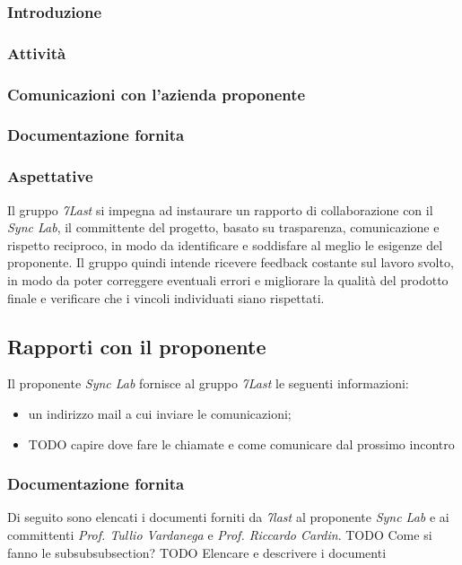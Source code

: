 \documentclass[italian,12pt]{article} %
\begin{document}
\subsubsection{Introduzione}
\subsubsection{Attività}
\subsubsection{Comunicazioni con l'azienda proponente}
\subsubsection{Documentazione fornita}

\subsubsection{Aspettative}
Il gruppo \textit{7Last} si impegna ad instaurare un rapporto di collaborazione con il \textit{Sync Lab}, il committente del progetto, basato su trasparenza, comunicazione e rispetto reciproco, in modo da identificare e soddisfare al meglio le esigenze del proponente.
Il gruppo quindi intende ricevere feedback costante sul lavoro svolto, in modo da poter correggere eventuali errori e migliorare la qualità del prodotto finale e verificare che i vincoli individuati siano rispettati.

\subsection{Rapporti con il proponente}
Il proponente \textit{Sync Lab} fornisce al gruppo \textit{7Last} le seguenti informazioni:
\begin{itemize}
	\itemsep0em
	\item un indirizzo mail a cui inviare le comunicazioni;
	\item TODO capire dove fare le chiamate e come comunicare dal prossimo incontro
\end{itemize}

\subsubsection{Documentazione fornita}
Di seguito sono elencati i documenti forniti da \textit{7last} al proponente \textit{Sync Lab} e ai committenti \textit{Prof. Tullio Vardanega} e \textit{Prof. Riccardo Cardin}.
TODO Come si fanno le subsubsubsection?
TODO Elencare e descrivere i documenti
\end{document}
